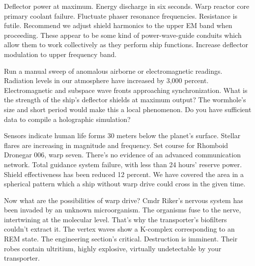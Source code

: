 Deflector power at maximum. Energy discharge in six seconds. Warp reactor core primary coolant failure. Fluctuate phaser resonance frequencies. Resistance is futile. Recommend we adjust shield harmonics to the upper EM band when proceeding. These appear to be some kind of power-wave-guide conduits which allow them to work collectively as they perform ship functions. Increase deflector modulation to upper frequency band.

Run a manual sweep of anomalous airborne or electromagnetic readings. Radiation levels in our atmosphere have increased by 3,000 percent. Electromagnetic and subspace wave fronts approaching synchronization. What is the strength of the ship's deflector shields at maximum output? The wormhole's size and short period would make this a local phenomenon. Do you have sufficient data to compile a holographic simulation?

Sensors indicate human life forms 30 meters below the planet's surface. Stellar flares are increasing in magnitude and frequency. Set course for Rhomboid Dronegar 006, warp seven. There's no evidence of an advanced communication network. Total guidance system failure, with less than 24 hours' reserve power. Shield effectiveness has been reduced 12 percent. We have covered the area in a spherical pattern which a ship without warp drive could cross in the given time.

Now what are the possibilities of warp drive? Cmdr Riker's nervous system has been invaded by an unknown microorganism. The organisms fuse to the nerve, intertwining at the molecular level. That's why the transporter's biofilters couldn't extract it. The vertex waves show a K-complex corresponding to an REM state. The engineering section's critical. Destruction is imminent. Their robes contain ultritium, highly explosive, virtually undetectable by your transporter.